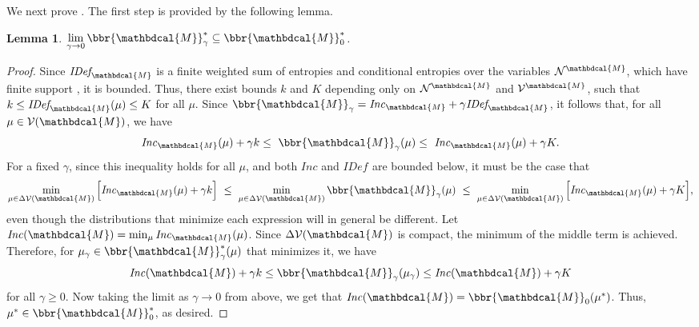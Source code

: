 \documentclass[letterpaper]{article} %
\theoremstyle{plain}
\newtheorem{lemma}[theorem]{Lemma}
\theoremstyle{definition}
\theoremstyle{remark}
\newcommand{\V}{\mathcal V}
\newcommand{\N}{\mathcal N}
\newcommand{\dg}[1]{\mathbdcal{#1}}
\newcommand{\IDef}[1]{\mathit{IDef}_{\!#1}}
\newcommand\Inc{\mathit{Inc}}
\begin{document}
We next prove .  The first step is provided by the
following lemma.
\begin{lemma}\label{lem:gamma2zero}
 $\lim\limits_{\gamma\to0}\bbr{\dg M}_\gamma^* \subseteq \bbr{\dg M}_0^*$. 
\end{lemma}
\begin{proof}
\def\lb{k}
\def\ub{K}  

Since $\IDef{\dg M}$ is a finite weighted sum of entropies
and conditional entropies over the variables $\N^{\dg M}$, which have
finite support%
, it is bounded.
Thus, there exist bounds $k$ and $K$ depending only on $\N^{\dg M}$ and
$\V^{\dg M}$, such that $\lb \leq \IDef{\dg M}(\mu) \leq \ub$ for all $\mu$.
Since $\bbr{\dg M}_\gamma = \Inc_{\dg M} + \gamma \IDef{\dg M}$,
it follows that, for all $\mu \in \V(\dg M)$, we have
\[ \Inc_{\dg M}( \mu) + \gamma\lb \leq~ \bbr{\dg M }_\gamma(\mu) 
\leq~  \Inc_{\dg M}( \mu) + \gamma\ub. \]
For a fixed $\gamma$, since this inequality holds for all $\mu$, and
both $\Inc$ and $\IDef{}$ are bounded below, it must be the case that  
\[
\min_{\mu \in \Delta\V(\dg M)} \Big[ \Inc_{\dg M}( \mu) + \gamma\lb \Big]
~\leq~ \min_{\mu \in \Delta\V(\dg M)}\bbr{\dg M }_\gamma(\mu) ~\leq~
\min_{\mu \in \Delta\V(\dg M)} \Big[ \Inc_{\dg M}( \mu) + \gamma\ub
    \Big], \] 
even though the distributions that minimize each expression will in general be different.
Let $\Inc(\dg M) = \min_{\mu} \Inc_{\dg M}(\mu)$.
Since $\Delta\V(\dg M)$ is compact, the minimum of the middle term is
achieved.  
Therefore, for $\mu_\gamma \in \bbr{\dg M}^*_\gamma(\mu)$ that
minimizes it, we have 
$$\Inc(\dg M) +\gamma \lb \le \bbr{\dg M }_\gamma(\mu_\gamma) \le
		 \Inc(\dg M) +\gamma \ub$$ for all $\gamma \ge 0.$
Now taking the limit as $\gamma\rightarrow 0$ from above, we get that
$\Inc(\dg M) = \bbr{\dg M }_0(\mu^*)$.
Thus, $\mu^* \in \bbr{\dg M}_0^*$, as desired.
\end{proof}
\end{document}
